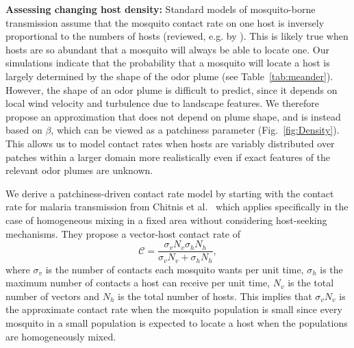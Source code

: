 \documentclass[10pt]{article}
\begin{document}
%

\textbf{Assessing changing host density: } Standard models of mosquito-borne transmission assume that the mosquito contact rate on one host is inversely proportional to the numbers of hosts (reviewed, e.g. by \cite{Wonham2006}). This is likely true when hosts are so abundant that a mosquito will always be able to locate one. Our simulations indicate that the probability that a mosquito will locate a host is largely determined by the shape of the odor plume (see Table~\ref{tab:meander}). However, the shape of an odor plume is difficult to predict, since it depends on local wind velocity and turbulence due to landscape features. We therefore propose an approximation that does not depend on plume shape, and is instead based on $\beta$, which can be viewed as a patchiness parameter (Fig.~\ref{fig:Density}).
This allows us to model contact rates when hosts are variably distributed over patches within a larger domain more realistically even if exact features of the relevant odor plumes are unknown.

We derive a patchiness-driven contact rate model by starting with the contact rate for malaria transmission from
Chitnis et al.~\cite{Chitnis2006} which applies specifically in the case of homogeneous mixing in a fixed area without considering host-seeking mechanisms.   They propose a vector-host contact rate of
\begin{equation*}
	\mathcal{C} = \frac{\sigma_v N_v\sigma_h N_h}{\sigma_v N_v + \sigma_h N_h},
\end{equation*}
where $\sigma_v$ is the number of contacts each mosquito wants per unit time, $\sigma_h$ is the maximum number of contacts a host can receive per unit time, $N_v$ is the total number of vectors and $N_h$ is the total number of hosts. This implies that $\sigma_v N_v$ is the approximate contact rate when the mosquito population is small since every mosquito in a small population is expected to locate a host when the populations are homogeneously mixed.
\end{document}
